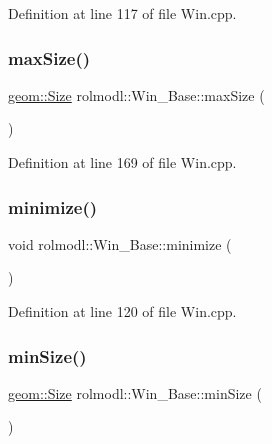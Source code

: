 Definition at line 117 of file Win.\+cpp.

\mbox{\label{classrolmodl_1_1_win___base_a58bff9f425da4b15e829f65214a6b993}} 
\subsubsection{\texorpdfstring{maxSize()}{maxSize()}}
{\footnotesize\ttfamily \mbox{\hyperlink{structrolmodl_1_1geom_1_1_size}{geom\+::\+Size}} rolmodl\+::\+Win\+\_\+\+Base\+::max\+Size (\begin{DoxyParamCaption}{ }\end{DoxyParamCaption})\hspace{0.3cm}{\ttfamily [noexcept]}}



Definition at line 169 of file Win.\+cpp.

\mbox{\label{classrolmodl_1_1_win___base_ac7fa1c8c4dd67b4fb5a14f80aeb494d7}} 
\subsubsection{\texorpdfstring{minimize()}{minimize()}}
{\footnotesize\ttfamily void rolmodl\+::\+Win\+\_\+\+Base\+::minimize (\begin{DoxyParamCaption}{ }\end{DoxyParamCaption})\hspace{0.3cm}{\ttfamily [noexcept]}}



Definition at line 120 of file Win.\+cpp.

\mbox{\label{classrolmodl_1_1_win___base_a661e48095b9161730e671de838e1f18a}} 
\subsubsection{\texorpdfstring{minSize()}{minSize()}}
{\footnotesize\ttfamily \mbox{\hyperlink{structrolmodl_1_1geom_1_1_size}{geom\+::\+Size}} rolmodl\+::\+Win\+\_\+\+Base\+::min\+Size (\begin{DoxyParamCaption}{ }\end{DoxyParamCaption})\hspace{0.3cm}{\ttfamily [noexcept]}}



